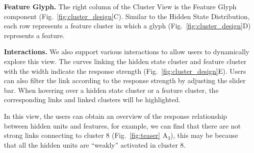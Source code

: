 \textbf{Feature Glyph.}
The right column of the Cluster View is the Feature Glyph component (Fig.~\ref{fig:cluster_design}C).
Similar to the Hidden State Distribution, each row represents a feature cluster in which a glyph (Fig.~\ref{fig:cluster_design}D) represents a feature.


\textbf{Interactions.}
We also support various interactions to allow users to dynamically explore this view.
The curves linking the hidden state cluster and feature cluster with the width indicate the response strength (Fig.~\ref{fig:cluster_design}E). Users can also filter the link according to the response strength by adjusting the slider bar. 
When hovering over a hidden state cluster or a feature cluster, the corresponding links and linked clusters will be highlighted.

In this view, the users can obtain an overview of the response relationship between hidden units and features, for example, we can find that there are not strong links connecting to cluster 8 (Fig.~\ref{fig:teaser} A$_3$), this may be because that all the hidden units are ``weakly'' activated in cluster 8.
